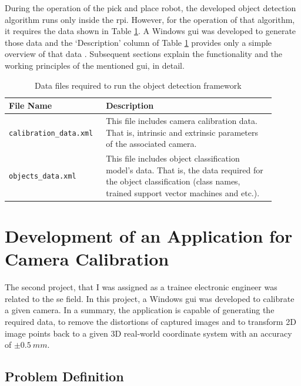 \documentclass[a4paper,12pt]{report}%
\begin{document}
During the operation of the pick and place robot, the developed object detection algorithm runs only inside the \ac{rpi}. However, for the operation of that algorithm, it requires the data shown in Table \ref{table:datafiles}. A Windows \ac{gui} was developed to generate those data and the `Description' column of Table \ref{table:datafiles} provides only a simple overview of that data . Subsequent sections explain the functionality and the working principles of the mentioned \ac{gui}, in detail.\\

\begin{table}[H]
	\captionsetup{font=sc, labelsep=newline}
	\centering
	\caption{ Data files required to run the object detection framework}
	\begin{tabular}{|p{0.3\linewidth}  |p{0.6\linewidth}  |}
		\hline
		\textbf{File Name} & \textbf{Description}\\\hline
		{\tt calibration\_data.xml} & This file includes camera calibration data. That is, intrinsic and extrinsic parameters of the associated camera.\\ \hline
		{\tt objects\_data.xml} & This file includes object classification model's data. That is, the data required for the object classification (class names, trained support vector machines and etc.).\\
		\hline
	\end{tabular}
	\label{table:datafiles}
\end{table}




\pagebreak
\section{Development of an Application for Camera Calibration}
\label{Development of an Application for Camera Calibration}
The second project, that I was assigned as a trainee electronic engineer was related to the \ac{se} field. In this project, a Windows \ac{gui} was developed to calibrate a given camera. In a summary, the application is capable of generating the required data, to remove the distortions of captured images and to transform 2D image points back to a given 3D real-world coordinate system with an accuracy of $\pm 0.5 ~mm$.

\subsection{Problem Definition}
\end{document}
